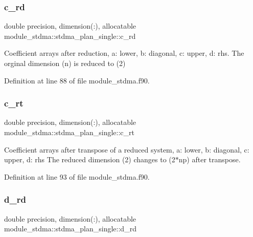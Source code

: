 \subsubsection{\texorpdfstring{c\_rd}{c\_rd}}
{\footnotesize\ttfamily double precision, dimension(\+:), allocatable module\+\_\+stdma\+::stdma\+\_\+plan\+\_\+single\+::c\+\_\+rd}



Coefficient arrays after reduction, a\+: lower, b\+: diagonal, c\+: upper, d\+: rhs. The orginal dimension (n) is reduced to (2) 



Definition at line 88 of file module\+\_\+stdma.\+f90.

\mbox{\label{structmodule__stdma_1_1stdma__plan__single_a9e2d3358d1a4aee945f9520f022221a7}} 
\subsubsection{\texorpdfstring{c\_rt}{c\_rt}}
{\footnotesize\ttfamily double precision, dimension(\+:), allocatable module\+\_\+stdma\+::stdma\+\_\+plan\+\_\+single\+::c\+\_\+rt}



Coefficient arrays after transpose of a reduced system, a\+: lower, b\+: diagonal, c\+: upper, d\+: rhs The reduced dimension (2) changes to (2$\ast$np) after transpose. 



Definition at line 93 of file module\+\_\+stdma.\+f90.

\mbox{\label{structmodule__stdma_1_1stdma__plan__single_a1a0f0eece00716c771d14880f2d120fa}} 
\subsubsection{\texorpdfstring{d\_rd}{d\_rd}}
{\footnotesize\ttfamily double precision, dimension(\+:), allocatable module\+\_\+stdma\+::stdma\+\_\+plan\+\_\+single\+::d\+\_\+rd}



